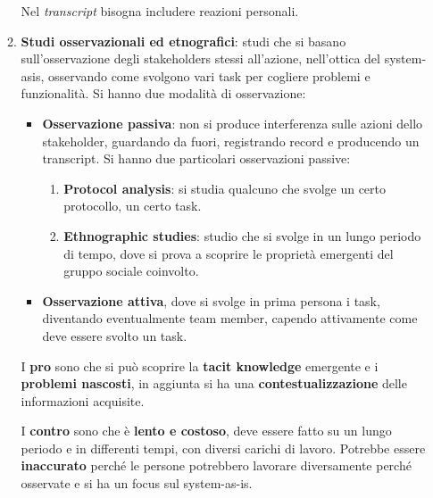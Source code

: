 \begin{itemize}
\begin{enumerate}
                        Nel \textit{transcript} bisogna includere reazioni personali.
                  \item \textbf{Studi osservazionali ed etnografici}: studi che si basano
                        sull'osservazione degli stakeholders stessi all'azione, nell'ottica del
                        system-asis, osservando come svolgono vari task per cogliere problemi e
                        funzionalità. Si hanno due modalità di osservazione:
                        \begin{itemize}
                              \item \textbf{Osservazione passiva}: non si produce interferenza
                                    sulle azioni dello stakeholder, guardando da fuori, registrando record e
                                    producendo un transcript. Si hanno due particolari osservazioni passive:
                                    \begin{enumerate}
                                          \item \textbf{Protocol analysis}: si studia qualcuno che svolge
                                                un certo protocollo, un certo task.
                                          \item \textbf{Ethnographic studies}: studio che si svolge in un
                                                lungo periodo di tempo, dove si prova a scoprire le proprietà
                                                emergenti del gruppo sociale coinvolto.
                                    \end{enumerate}
                              \item \textbf{Osservazione attiva}, dove si svolge in prima persona
                                    i task, diventando eventualmente team member, capendo attivamente
                                    come deve essere svolto un task.
                        \end{itemize}

                        I \textbf{pro} sono che si può scoprire la \textbf{tacit knowledge}
                        emergente e i \textbf{problemi nascosti}, in aggiunta si
                        ha una \textbf{contestualizzazione} delle informazioni
                        acquisite.

                        I \textbf{contro} sono che è \textbf{lento e costoso},
                        deve essere fatto su un lungo periodo e in differenti
                        tempi, con diversi carichi di lavoro. Potrebbe essere
                        \textbf{inaccurato} perché le persone potrebbero lavorare
                        diversamente perché osservate e si ha un focus sul
                        system-as-is.


\end{enumerate}
\end{itemize}

